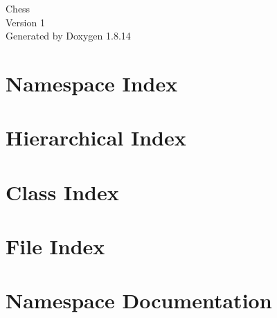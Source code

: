 \documentclass[twoside]{book}
\newcommand{\+}{\discretionary{\mbox{\scriptsize$\hookleftarrow$}}{}{}}
\newcommand{\clearemptydoublepage}{%
  \newpage{\pagestyle{empty}\cleardoublepage}%
}
\begin{document}
\hypersetup{pageanchor=false,
             bookmarksnumbered=true,
             pdfencoding=unicode
            }
\begin{titlepage}
\vspace*{7cm}
\begin{center}%
{\Large Chess \\[1ex]\large Version 1 }\\
\vspace*{1cm}
{\large Generated by Doxygen 1.8.14}\\
\end{center}
\end{titlepage}
\clearemptydoublepage
{}
\tableofcontents
\clearemptydoublepage
{}
\hypersetup{pageanchor=true}

\chapter{Namespace Index}

\chapter{Hierarchical Index}

\chapter{Class Index}

\chapter{File Index}

\chapter{Namespace Documentation}





\end{document}
